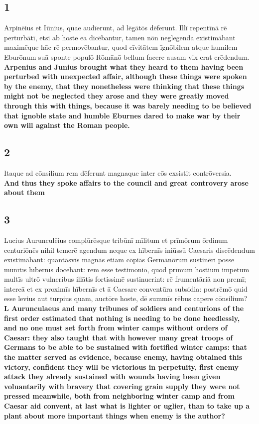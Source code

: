 \documentclass{article}
\begin{document}
\subsection*{1}
Arpinēius et Iūnius, quae audīerunt, ad lēgātōs dēferunt. Illī repentīnā rē perturbātī, etsi ab hoste ea dīcēbantur, tamen nōn neglegenda exīstimābant maximēque hāc rē permovēbantur, quod cīvitātem īgnōbilem atque humilem Eburōnum suā sponte populō Rōmānō bellum facere ausam vix erat crēdendum. \\
\textbf{Arpenius and Junius brought what they heard to them having been perturbed with unexpected affair, although these things were spoken by the enemy, that they nonetheless were thinking that these things might not be neglected they arose and they were greatly moved through this with things, because it was barely needing to be believed that ignoble state and humble Eburnes dared to make war by their own will against the Roman people.}

\subsection*{2}
Itaque ad cōnsilium rem dēferunt magnaque inter eōs exsistit contrōversia. \\
\textbf{And thus they spoke affairs to the council and great controvery arose about them}

\subsection*{3}
Lucius Aurunculēius complūrēsque tribūnī mīlitum et prīmōrum ōrdinum centuriōnēs nihil temerē agendum neque ex hībernīs iniūssū Caesaris discēdendum exīstimābant: quantāsvīs magnās etiam cōpiās Germānōrum sustinērī posse mūnītīs hībernīs docēbant: rem esse testimōniō, quod prīmum hostium impetum multīs ultrō vulneribus illātis fortissimē sustinuerint: rē frumentāriā non premī; intereā et ex proximīs hībernīs et ā Caesare conventūra subsidia: postrēmō quid esse levius aut turpius quam, auctōre hoste, dē summīs rēbus capere cōnsilium?\\
\textbf{L Aurunculaeus and many tribunes of soldiers and centurions of the first order estimated that nothing is needing to be done heedlessly, and no one must set forth from winter camps without orders of Caesar: they also taught that with however many great troops of Germans to be able to be sustained with fortified winter camps: that the matter served as evidence, because enemy, having obtained this victory, confident they will be victorious in perpetuity,  first enemy attack they already sustained with wounds having been given voluantarily with bravery that covering grain supply they were not pressed meanwhile, both from neighboring winter camp and from Caesar aid  convent, at last what is lighter or uglier, than to take up a plant about more important things when enemy is the author?}
\end{document}

